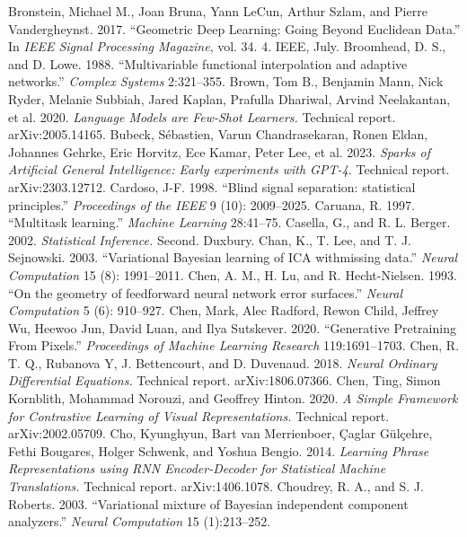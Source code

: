  Bronstein, Michael M., Joan Bruna, Yann LeCun, Arthur Szlam, and Pierre Vandergheynst. 2017. ``Geometric Deep Learning: Going Beyond Euclidean Data.'' In \emph{IEEE Signal Processing Magazine}, vol. 34. 4. IEEE, July.
 Broomhead, D. S., and D. Lowe. 1988. ``Multivariable functional interpolation and adaptive networks.'' \emph{Complex Systems} 2:321--355.
 Brown, Tom B., Benjamin Mann, Nick Ryder, Melanie Subbiah, Jared Kaplan, Prafulla Dhariwal, Arvind Neelakantan, et al. 2020. \emph{Language Models are Few-Shot Learners.} Technical report. arXiv:2005.14165.
 Bubeck, S\'ebastien, Varun Chandrasekaran, Ronen Eldan, Johannes Gehrke, Eric Horvitz, Ece Kamar, Peter Lee, et al. 2023. \emph{Sparks of Artificial General Intelligence: Early experiments with GPT-4.} Technical report. arXiv:2303.12712.
 Cardoso, J-F. 1998. ``Blind signal separation: statistical principles.'' \emph{Proceedings of the IEEE} 9 (10): 2009--2025.
 Caruana, R. 1997. ``Multitask learning.'' \emph{Machine Learning} 28:41--75.
 Casella, G., and R. L. Berger. 2002. \emph{Statistical Inference.} Second. Duxbury.
 Chan, K., T. Lee, and T. J. Sejnowski. 2003. ``Variational Bayesian learning of ICA withmissing data.'' \emph{Neural Computation} 15 (8): 1991--2011.
 Chen, A. M., H. Lu, and R. Hecht-Nielsen. 1993. ``On the geometry of feedforward neural network error surfaces.'' \emph{Neural Computation} 5 (6): 910--927.
 Chen, Mark, Alec Radford, Rewon Child, Jeffrey Wu, Heewoo Jun, David Luan, and Ilya Sutskever. 2020. ``Generative Pretraining From Pixels.'' \emph{Proceedings of Machine Learning Research} 119:1691--1703.
 Chen, R. T. Q., Rubanova Y, J. Bettencourt, and D. Duvenaud. 2018. \emph{Neural Ordinary Differential Equations.} Technical report. arXiv:1806.07366.
 Chen, Ting, Simon Kornblith, Mohammad Norouzi, and Geoffrey Hinton. 2020. \emph{A Simple Framework for Contrastive Learning of Visual Representations.} Technical report. arXiv:2002.05709.
 Cho, Kyunghyun, Bart van Merrienboer, \c{C}aglar G\"ul\c{c}ehre, Fethi Bougares, Holger Schwenk, and Yoshua Bengio. 2014. \emph{Learning Phrase Representations using RNN Encoder-Decoder for Statistical Machine Translations.} Technical report. arXiv:1406.1078.
 Choudrey, R. A., and S. J. Roberts. 2003. ``Variational mixture of Bayesian independent component analyzers.'' \emph{Neural Computation} 15 (1):213--252.
